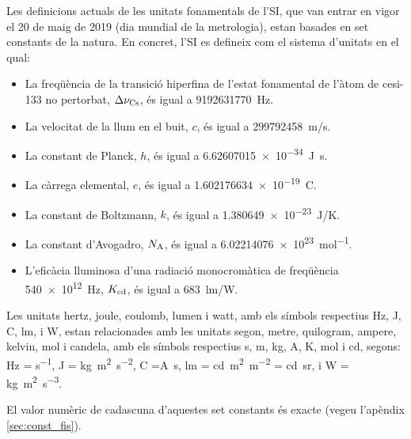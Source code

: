 Les definicions actuals de les unitats fonamentals de l'SI, que van entrar en vigor el 20 de maig de 2019 (dia mundial de la metrologia), estan basades en set constants de la natura. En concret, l'SI es defineix com el  sistema d'unitats en el qual:
\begin{itemize}

\item La freqüència de la transició hiperfina de l'estat fonamental de l'àtom de cesi-133 no pertorbat, $\Delta\nu_\mathrm{Cs}$, és igual a \qty{9 192 631 770}{Hz}.
\item La velocitat de la llum en el buit, $c$, és igual a \qty{299792458}{m/s}.
\item La constant de Planck, $h$, és igual a \qty{6,62607015 e-34}{J.s}.
\item La càrrega elemental, $e$, és igual a \qty{1,602176634 e-19}{C}.
\item La constant de Boltzmann, $k$, és igual a \qty{1,380649e-23}{J/K}.
\item La constant d'Avogadro, $N_\mathrm{A}$, és igual a \qty{6,02214076 e23}{mol^{-1}}.
\item L'eficàcia lluminosa d'una radiació monocromàtica de freqüència \qty{540e12}{Hz},  $K_\mathrm{cd}$, és igual a \qty{683}{lm/W}.
\end{itemize}


Les unitats  hertz, joule, coulomb, lumen i watt, amb els símbols respectius Hz, J, C, lm, i W, estan relacionades amb les unitats segon, metre, quilogram, ampere, kelvin, mol i candela, amb els símbols respectius s, m, kg, A, K, mol i cd, segons:  Hz = \unit{s^{-1}}, J = \unit{kg.m^2.s^{-2}}, C =\unit{A.s}, lm = \unit{cd.m^2.m^{-2}} = \unit{cd.sr}, i W = \unit{kg.m^2.s^{-3}}.

El valor numèric de cadascuna d'aquestes set constants és exacte (vegeu l'apèndix \vref{sec:const_fis}).

